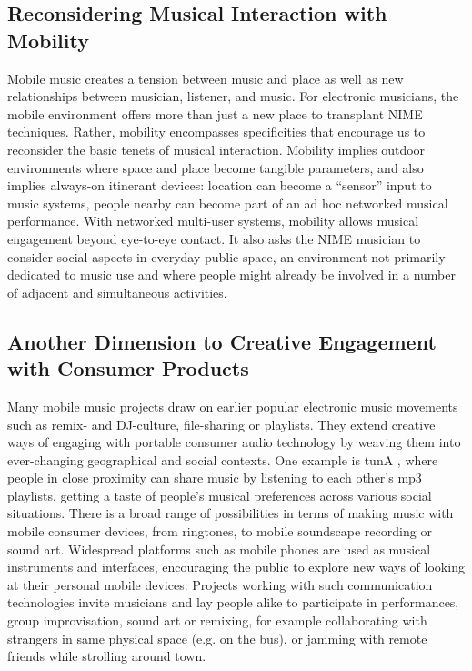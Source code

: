 \subsection{Reconsidering Musical Interaction with Mobility}

Mobile music creates a tension between music and place as well as new
relationships between musician, listener, and music. For electronic musicians,
the mobile environment offers more than just a new place to transplant NIME
techniques. Rather, mobility encompasses specificities that encourage us to
reconsider the basic tenets of musical interaction. Mobility implies outdoor
environments where space and place become tangible parameters, and also implies
always-on itinerant devices: location can become a ``sensor'' input to music
systems, people nearby can become part of an ad hoc networked musical
performance. With networked multi-user systems, mobility allows musical
engagement beyond eye-to-eye contact. It also asks the NIME musician to consider
social aspects in everyday public space, an environment not primarily dedicated
to music use and where people might already be involved in a number of adjacent
and simultaneous activities.

\subsection{Another Dimension to Creative Engagement with Consumer Products}

Many mobile music projects draw on earlier popular electronic music movements
such as remix- and DJ-culture, file-sharing or playlists. They extend creative
ways of engaging with portable consumer audio technology by weaving them into
ever-changing geographical and social contexts. One example is tunA \cite{Bassoli:2004}, where
people in close proximity can share music by listening to each other's mp3
playlists, getting a taste of people's musical preferences across various social
situations. There is a broad range of possibilities in terms of making music with
mobile consumer devices, from ringtones, to mobile soundscape recording or sound
art. Widespread platforms such as mobile phones are used as musical instruments
and interfaces, encouraging the public to explore new ways of looking at their
personal mobile devices. Projects working with such communication technologies
invite musicians and lay people alike to participate in performances, group
improvisation, sound art or remixing, for example collaborating with strangers in
same physical space (e.g. on the bus), or jamming with remote friends while
strolling around town.

